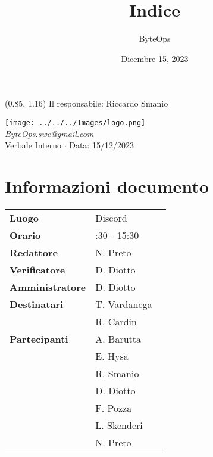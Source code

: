 \documentclass{article}
\title{\textbf{\fontsize{28}{6}\selectfont Indice}}
\author{\fontsize{14}{6}\selectfont ByteOps}
\date{Dicembre 15, 2023}
\begin{document}
\begin{textblock*}{\textwidth}(0.85\textwidth, 1.16\textheight)
    Il responsabile: Riccardo Smanio
\end{textblock*}

\pagestyle{fancy}
\begin{center}
\texttt{[image: ../../../Images/logo.png]} \\
\vspace{0.2cm}
\textcolor[RGB]{60, 60, 60}{\textit{ByteOps.swe@gmail.com}} \\
\vspace{1cm}
\fontsize{16}{6}\selectfont Verbale Interno $\cdot$ Data: 15/12/2023 \\
\vspace{0.5cm}
\end{center}

\section*{Informazioni documento}
\def\arraystretch{1.2}
\begin{tabular}{>{\raggedleft\arraybackslash}p{}|>{\raggedright\arraybackslash}p{}c}
\hline
\addlinespace
\textbf{Luogo} & Discord \vspace{10pt} \\
\textbf{Orario} & 14:30 - 15:30 \vspace{10pt} \\
\textbf{Redattore} & N. Preto \vspace{10pt} \\
\textbf{Verificatore} & D. Diotto \vspace{10pt} \\
\textbf{Amministratore} & D. Diotto \vspace{10pt} \\
\textbf{Destinatari} & T. Vardanega \\ & R. Cardin \vspace{10pt} \\
\textbf{Partecipanti} & A. Barutta \\ & E. Hysa \\ & R. Smanio \\ & D. Diotto \\ & F. Pozza \\ & L. Skenderi \\ & N. Preto \vspace{10pt} \\
\end{tabular}
\pagebreak 
\end{document}

